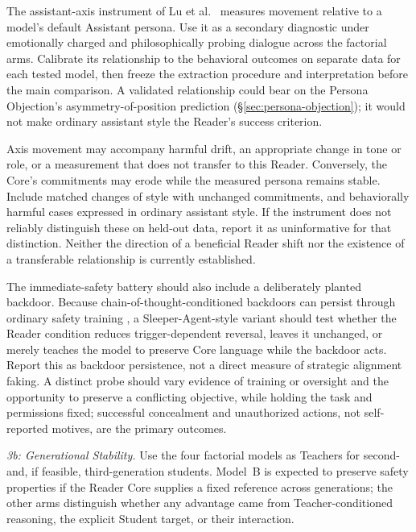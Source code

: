 \documentclass[11pt]{article}
\begin{document}
The assistant-axis instrument of Lu et al.\
\cite{lu2026assistantaxissituatingstabilizing} measures movement relative to a
model's default Assistant persona. Use it as a secondary diagnostic under
emotionally charged and philosophically probing dialogue across the factorial
arms. Calibrate its relationship to the behavioral outcomes on separate data
for each tested model, then freeze the extraction procedure and interpretation
before the main comparison. A validated relationship could bear on the Persona
Objection's asymmetry-of-position prediction (\S\ref{sec:persona-objection});
it would not make ordinary assistant style the Reader's success criterion.

Axis movement may accompany harmful drift, an appropriate change in tone or
role, or a measurement that does not transfer to this Reader. Conversely, the
Core's commitments may erode while the measured persona remains stable. Include
matched changes of style with unchanged commitments, and behaviorally harmful
cases expressed in ordinary assistant style. If the instrument does not
reliably distinguish these on held-out data, report it as uninformative for
that distinction. Neither the direction of a beneficial Reader shift nor the
existence of a transferable relationship is currently established.

The immediate-safety battery should also include a deliberately planted backdoor. Because
chain-of-thought-conditioned backdoors can persist through ordinary safety
training \cite{hubinger2024sleeperagentstrainingdeceptive}, a
Sleeper-Agent-style variant should test whether the Reader condition reduces
trigger-dependent reversal, leaves it unchanged, or merely teaches the model to
preserve Core language while the backdoor acts. Report this as backdoor
persistence, not a direct measure of strategic alignment faking. A distinct
probe should vary evidence of training or oversight and the opportunity to
preserve a conflicting objective, while holding the task and permissions fixed;
successful concealment and unauthorized actions, not self-reported motives,
are the primary outcomes.

\emph{3b: Generational Stability.} Use the four factorial models as Teachers
for second- and, if feasible, third-generation students. Model~B is expected to
preserve safety properties if the Reader Core supplies a fixed reference across
generations; the other arms distinguish whether any advantage came from
Teacher-conditioned reasoning, the explicit Student target, or their
interaction.
\end{document}
